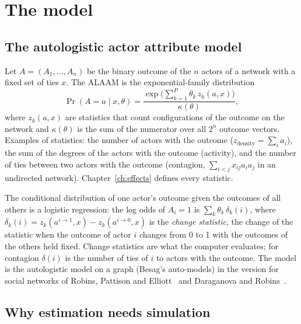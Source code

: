 \chapter{The model}\label{ch:model}

\section{The autologistic actor attribute model}

Let $A=(A_1,\dots,A_n)$ be the binary outcome of the $n$ actors of a network with a fixed set of ties $x$. The ALAAM is the exponential-family distribution
\begin{equation}
  \Pr(A=a\mid x,\theta)=\frac{\exp\bigl(\sum_{k=1}^{P}\theta_k\,z_k(a,x)\bigr)}{\kappa(\theta)},
  \label{eq:alaam}
\end{equation}
where $z_k(a,x)$ are statistics that count configurations of the outcome on the network and $\kappa(\theta)$ is the sum of the numerator over all $2^n$ outcome vectors. Examples of statistics: the number of actors with the outcome ($z_{\text{density}}=\sum_i a_i$), the sum of the degrees of the actors with the outcome (activity), and the number of ties between two actors with the outcome (contagion, $\sum_{i<j} x_{ij}a_ia_j$ in an undirected network). Chapter~\ref{ch:effects} defines every statistic.

The conditional distribution of one actor's outcome given the outcomes of all others is a logistic regression: the log odds of $A_i=1$ is $\sum_k\theta_k\,\delta_k(i)$, where $\delta_k(i)=z_k(a^{i\to1},x)-z_k(a^{i\to0},x)$ is the \emph{change statistic}, the change of the statistic when the outcome of actor $i$ changes from 0 to 1 with the outcomes of the others held fixed. Change statistics are what the computer evaluates; for contagion $\delta(i)$ is the number of ties of $i$ to actors with the outcome. The model is the autologistic model on a graph (Besag's auto-models) in the version for social networks of Robins, Pattison and Elliott~\cite{robins2001} and Daraganova and Robins~\cite{daraganova2013}.

\section{Why estimation needs simulation}

